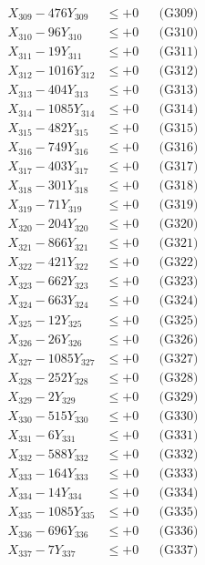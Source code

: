 \documentclass[a4paper,10pt]{article}
\begin{document}
{\begin{align}
X_{309} - 476Y_{309} &\leq +0 && \text{(G309)} \\
X_{310} - 96Y_{310} &\leq +0 && \text{(G310)} \\
\allowbreak
X_{311} - 19Y_{311} &\leq +0 && \text{(G311)} \\
X_{312} - 1016Y_{312} &\leq +0 && \text{(G312)} \\
X_{313} - 404Y_{313} &\leq +0 && \text{(G313)} \\
X_{314} - 1085Y_{314} &\leq +0 && \text{(G314)} \\
X_{315} - 482Y_{315} &\leq +0 && \text{(G315)} \\
X_{316} - 749Y_{316} &\leq +0 && \text{(G316)} \\
X_{317} - 403Y_{317} &\leq +0 && \text{(G317)} \\
X_{318} - 301Y_{318} &\leq +0 && \text{(G318)} \\
X_{319} - 71Y_{319} &\leq +0 && \text{(G319)} \\
X_{320} - 204Y_{320} &\leq +0 && \text{(G320)} \\
\allowbreak
X_{321} - 866Y_{321} &\leq +0 && \text{(G321)} \\
X_{322} - 421Y_{322} &\leq +0 && \text{(G322)} \\
X_{323} - 662Y_{323} &\leq +0 && \text{(G323)} \\
X_{324} - 663Y_{324} &\leq +0 && \text{(G324)} \\
X_{325} - 12Y_{325} &\leq +0 && \text{(G325)} \\
X_{326} - 26Y_{326} &\leq +0 && \text{(G326)} \\
X_{327} - 1085Y_{327} &\leq +0 && \text{(G327)} \\
X_{328} - 252Y_{328} &\leq +0 && \text{(G328)} \\
X_{329} - 2Y_{329} &\leq +0 && \text{(G329)} \\
X_{330} - 515Y_{330} &\leq +0 && \text{(G330)} \\
\allowbreak
X_{331} - 6Y_{331} &\leq +0 && \text{(G331)} \\
X_{332} - 588Y_{332} &\leq +0 && \text{(G332)} \\
X_{333} - 164Y_{333} &\leq +0 && \text{(G333)} \\
X_{334} - 14Y_{334} &\leq +0 && \text{(G334)} \\
X_{335} - 1085Y_{335} &\leq +0 && \text{(G335)} \\
X_{336} - 696Y_{336} &\leq +0 && \text{(G336)} \\
X_{337} - 7Y_{337} &\leq +0 && \text{(G337)} \\

\end{align}}
\end{document}
